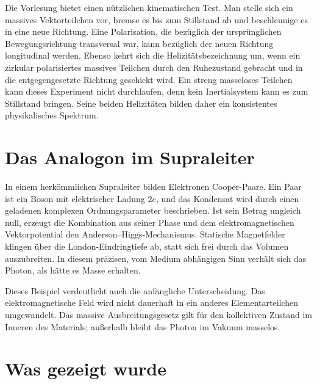 \begin{classroomqa}
\end{classroomqa}

Die Vorlesung bietet einen nützlichen kinematischen Test. Man stelle sich ein massives Vektorteilchen vor, bremse es bis zum Stillstand ab und beschleunige es in eine neue Richtung. Eine Polarisation, die bezüglich der ursprünglichen Bewegungsrichtung transversal war, kann bezüglich der neuen Richtung longitudinal werden. Ebenso kehrt sich die Helizitätsbezeichnung um, wenn ein zirkular polarisiertes massives Teilchen durch den Ruhezustand gebracht und in die entgegengesetzte Richtung geschickt wird. Ein streng masseloses Teilchen kann dieses Experiment nicht durchlaufen, denn kein Inertialsystem kann es zum Stillstand bringen. Seine beiden Helizitäten bilden daher ein konsistentes physikalisches Spektrum.

\section{Das Analogon im Supraleiter}

In einem herkömmlichen Supraleiter bilden Elektronen Cooper-Paare. Ein Paar ist ein Boson mit elektrischer Ladung \(2e\), und das Kondensat wird durch einen geladenen komplexen Ordnungsparameter beschrieben. Ist sein Betrag ungleich null, erzeugt die Kombination aus seiner Phase und dem elektromagnetischen Vektorpotential den Anderson--Higgs-Mechanismus. Statische Magnetfelder klingen über die London-Eindringtiefe ab, statt sich frei durch das Volumen auszubreiten. In diesem präzisen, vom Medium abhängigen Sinn verhält sich das Photon, als hätte es Masse erhalten.

Dieses Beispiel verdeutlicht auch die anfängliche Unterscheidung. Das elektromagnetische Feld wird nicht dauerhaft in ein anderes Elementarteilchen umgewandelt. Das massive Ausbreitungsgesetz gilt für den kollektiven Zustand im Inneren des Materials; außerhalb bleibt das Photon im Vakuum masselos.

\section{Was gezeigt wurde}


